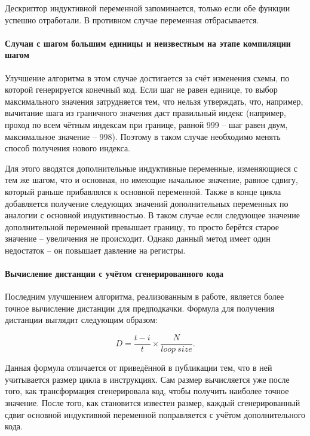 \documentclass[12pt,a4paper,oneside]{article}
\begin{document}
Дескриптор индуктивной переменной запоминается, только если обе функции успешно отработали. В противном случае переменная отбрасывается.

\paragraph{Случаи с шагом большим единицы и неизвестным на этапе компиляции шагом}

Улучшение алгоритма в этом случае достигается за счёт изменения схемы, по которой генерируется конечный код. Если шаг не равен единице, то выбор максимального значения затрудняется тем, что нельзя утверждать, что, например, вычитание шага из граничного значения даст правильный индекс (например, проход по всем чётным индексам при границе, равной 999 -- шаг равен двум, максимальное значение -- 998). Поэтому в таком случае необходимо менять способ получения нового индекса.

Для этого вводятся дополнительные индуктивные переменные, изменяющиеся с тем же шагом, что и основная, но имеющие начальное значение, равное сдвигу, который раньше прибавлялся к основной переменной. Также в конце цикла добавляется получение следующих значений дополнительных переменных по аналогии с основной индуктивностью. В таком случае если следующее значение дополнительной переменной превышает границу, то просто берётся старое значение -- увеличения не происходит. Однако данный метод имеет один недостаток -- он повышает давление на регистры.

\paragraph{Вычисление дистанции с учётом сгенерированного кода}

Последним улучшением алгоритма, реализованным в работе, является более точное вычисление дистанции для предподкачки. Формула для получения дистанции выглядит следующим образом:

\begin{displaymath}
  D = \frac{t - i}{t} \times \frac{N}{loop\ size}.
\end{displaymath}

Данная формула отличается от приведённой в публикации тем, что в ней учитывается размер цикла в инструкциях. Сам размер вычисляется уже после того, как трансформация сгенерировала код, чтобы получить наиболее точное значение. После того, как становится известен размер, каждый сгенерированный сдвиг основной индуктивной переменной поправляется с учётом дополнительного кода.
\end{document}
